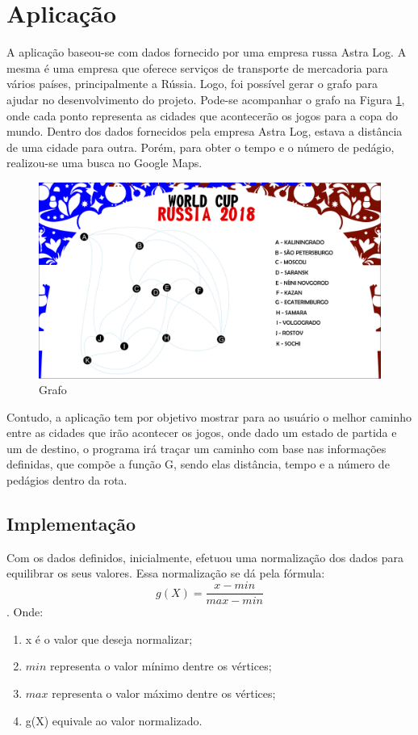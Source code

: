 \documentclass[12pt]{article}
\begin{document}
\section{Aplicação}
A aplicação baseou-se com dados fornecido por uma empresa russa Astra Log. A mesma é uma empresa que oferece serviços de transporte de mercadoria para vários países, principalmente a Rússia. Logo, foi possível gerar o grafo para ajudar no desenvolvimento do projeto. Pode-se acompanhar o grafo na Figura \ref{fig:fig1}, onde cada ponto representa as cidades que acontecerão os jogos para a copa do mundo. Dentro dos dados fornecidos pela empresa Astra Log, estava a distância de uma cidade para outra. Porém, para obter o tempo e o número de pedágio, realizou-se uma busca no Google Maps. 
\begin{figure}[h]
	\centering
	\includegraphics[width=0.9\columnwidth]{imagem/GRAFO}
	\caption{Grafo}
	\label{fig:fig1}
\end{figure}
Contudo, a aplicação tem por objetivo mostrar para ao usuário o melhor caminho entre as cidades que irão acontecer os jogos, onde dado um estado de partida e um de destino, o programa irá traçar um caminho com base nas informações definidas, que compõe a função G, sendo elas distância, tempo e a número de pedágios dentro da rota.
\subsection{Implementação}
Com os dados definidos, inicialmente, efetuou uma normalização dos dados para equilibrar os seus valores. Essa normalização se dá pela fórmula: \[ g(X) = \frac{x - min}{max - min} \]. Onde:
\begin{enumerate}
	\item x é o valor que deseja normalizar;
	\item $min$ representa o valor mínimo dentre os vértices;
	\item $max$ representa o valor máximo dentre os vértices;
	\item g(X) equivale ao valor normalizado. 
\end{enumerate}
\end{document}
